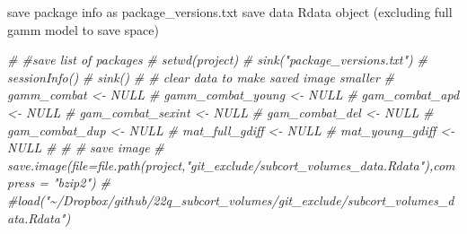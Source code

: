 \documentclass[
]{article}
\newenvironment{Shaded}{\begin{snugshade}}{\end{snugshade}}
\newcommand{\CommentTok}[1]{\textcolor[rgb]{0.56,0.35,0.01}{\textit{#1}}}
\begin{document}
save package info as package\_versions.txt save data Rdata object
(excluding full gamm model to save space)

\begin{Shaded}
\begin{Highlighting}[]
\CommentTok{\# \#save list of packages}
\CommentTok{\# setwd(project)}
\CommentTok{\# sink("package\_versions.txt")}
\CommentTok{\# sessionInfo()}
\CommentTok{\# sink()}
\CommentTok{\# \# clear data to make saved image smaller}
\CommentTok{\# gamm\_combat \textless{}{-} NULL}
\CommentTok{\# gamm\_combat\_young \textless{}{-} NULL}
\CommentTok{\# gam\_combat\_apd \textless{}{-} NULL}
\CommentTok{\# gam\_combat\_sexint \textless{}{-} NULL}
\CommentTok{\# gam\_combat\_del \textless{}{-} NULL}
\CommentTok{\# gam\_combat\_dup \textless{}{-} NULL}
\CommentTok{\# mat\_full\_gdiff \textless{}{-} NULL}
\CommentTok{\# mat\_young\_gdiff \textless{}{-} NULL}
\CommentTok{\# }
\CommentTok{\# \# save image}
\CommentTok{\# save.image(file=file.path(project,"git\_exclude/subcort\_volumes\_data.Rdata"),compress = "bzip2")}
\CommentTok{\# \#load("\textasciitilde{}/Dropbox/github/22q\_subcort\_volumes/git\_exclude/subcort\_volumes\_data.Rdata")}
\end{Highlighting}
\end{Shaded}
\end{document}
